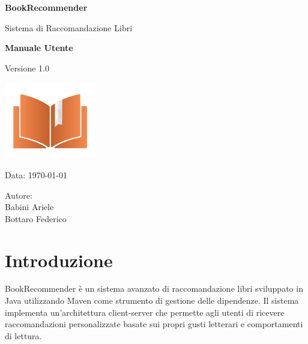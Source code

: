 \documentclass[12pt,a4paper]{article}
\begin{document}
\begin{titlepage}
    \centering
    \vspace*{2cm}
    
    {\Huge\bfseries\color{primaryblue} BookRecommender}
    
    \vspace{1cm}
    
    {\Large Sistema di Raccomandazione Libri}
    
    \vspace{2cm}
    
    {\LARGE\bfseries Manuale Utente}
    
    \vspace{1cm}
    
    {\large Versione 1.0}
    
    \vspace{3cm}
    \includegraphics[width=0.3\textwidth]{img/LogoDoc.png}
    
    \vfill
    
    {\large Data: \today}
    
    \vspace{1cm}
    
    {\large Autore:
                    \\Babini Ariele
                    \\Bottaro Federico}
    
\end{titlepage}

\tableofcontents
\newpage

\section{Introduzione}

BookRecommender è un sistema avanzato di raccomandazione libri sviluppato in Java utilizzando Maven come strumento di gestione delle dipendenze. Il sistema implementa un'architettura client-server che permette agli utenti di ricevere raccomandazioni personalizzate basate sui propri gusti letterari e comportamenti di lettura.
\end{document}
